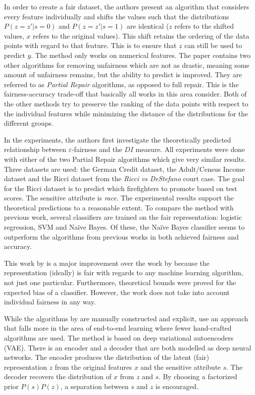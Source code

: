In order to create a fair dataset,
the authors present an algorithm that considers every feature individually
and shifts the values such that the distributions \(P(z=z'|s=0)\) and \(P(z=z'|s=1)\) are identical
(\(z\) refers to the shifted values, \(x\) refers to the original values).
This shift retains the ordering of the data points with regard to that feature.
This is to ensure that \(z\) can still be used to predict \(y\).
The method only works on numerical features.
The paper contains two other algorithms for removing unfairness which are not as drastic,
meaning some amount of unfairness remains, but the ability to predict is improved.
They are referred to as \emph{Partial Repair} algorithms, as opposed to full repair.
This is the fairness-accuracy trade-off that basically all works in this area consider.
Both of the other methods try to preserve the ranking of the data points
with respect to the individual features
while minimizing the distance of the distributions for the different groups.

In the experiments, the authors first investigate the theoretically predicted relationship
between \(\varepsilon\)-fairness and the \(DI\) measure.
All experiments were done with either of the two Partial Repair algorithms
which give very similar results.
Three datasets are used:
the German Credit dataset, the Adult/Census Income dataset
and the Ricci dataset from the \emph{Ricci vs DeStefano} court case.
The goal for the Ricci dataset is to predict which firefighters to promote based on test scores.
The sensitive attribute is \emph{race}.
The experimental results support the theoretical predictions to a reasonable extent.
To compare the method with previous work,
several classifiers are trained on the fair representation:
logistic regression, SVM and Na\"ive Bayes.
Of these, the Na\"ive Bayes classifier seems to outperform the algorithms from previous works
\citep{kamiran2009classifying,kamishima2012fairness,zemel2013learning}
in both achieved fairness and accuracy.

This work by \citet{feldman2015certifying} is a major improvement over the work by \citet{zemel2013learning}
because the representation (ideally) is fair with regards to any machine learning algorithm, not just one particular.
Furthermore, theoretical bounds were proved for the expected bias of a classifier.
However, the work does not take into account individual fairness in any way.

While the algorithms by \citet{feldman2015certifying} are manually constructed and explicit,
\citet{louizos2016variational} use an approach
that falls more in the area of end-to-end learning where fewer hand-crafted algorithms are used.
The method is based on deep variational autoencoders (VAE).
There is an encoder and a decoder that are both modelled as deep neural networks.
The encoder produces the distribution of the latent (fair) representation \(z\)
from the original features \(x\) and the sensitive attribute \(s\).
The decoder recovers the distribution of \(x\) from \(z\) and \(s\).
By choosing a factorized prior \(P(s)P(z)\), a separation between \(s\) and \(z\) is encouraged.

